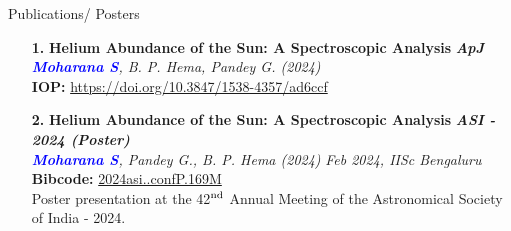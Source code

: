 \documentclass{resume} %
\begin{document}
\begin{rSection}{Publications/ Posters}
\begin{enumerate}
    \item[\textbf{1.}] {\bf Helium Abundance of the Sun: A Spectroscopic Analysis} \hfill {\em \bf \textit{ApJ}} \\
    \textbf{\textcolor{blue}{\textit{Moharana S}}}\textit{, B. P. Hema, Pandey G. (2024)}\\
    \textbf{IOP: }\href{https://doi.org/10.3847/1538-4357/ad6ccf}{https://doi.org/10.3847/1538-4357/ad6ccf}
    
    \item[\textbf{2.}] {\bf Helium Abundance of the Sun: A Spectroscopic Analysis} \hfill {\em \textbf{ASI - 2024 (Poster)}} \\
    \textbf{\textcolor{blue}{\textit{Moharana S}}}\textit{, Pandey G., B. P. Hema (2024)} \hfill
    {\em Feb 2024, IISc Bengaluru}\\
    \textbf{Bibcode:} \href{https://ui.adsabs.harvard.edu/abs/2024asi..confP.169M/abstract}{2024asi..confP.169M} \\
    Poster presentation at the 42$^{\rm nd}$ Annual Meeting of the Astronomical Society of India - 2024.
\end{enumerate}

\end{rSection}
\end{document}
